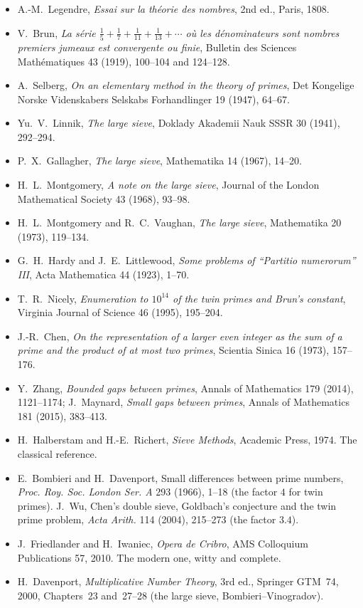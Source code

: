 \begin{itemize}
\item A.-M.~Legendre, \emph{Essai sur la théorie des nombres}, 2nd ed., Paris, 1808.
\item V.~Brun, \emph{La série $\frac15+\frac17+\frac1{11}+\frac1{13}+\cdots$ où les dénominateurs sont nombres premiers jumeaux est convergente ou finie}, Bulletin des Sciences Mathématiques 43 (1919), 100--104 and 124--128.
\item A.~Selberg, \emph{On an elementary method in the theory of primes}, Det Kongelige Norske Videnskabers Selskabs Forhandlinger 19 (1947), 64--67.
\item Yu.~V.~Linnik, \emph{The large sieve}, Doklady Akademii Nauk SSSR 30 (1941), 292--294.
\item P.~X.~Gallagher, \emph{The large sieve}, Mathematika 14 (1967), 14--20.
\item H.~L.~Montgomery, \emph{A note on the large sieve}, Journal of the London Mathematical Society 43 (1968), 93--98.
\item H.~L.~Montgomery and R.~C.~Vaughan, \emph{The large sieve}, Mathematika 20 (1973), 119--134.
\item G.~H.~Hardy and J.~E.~Littlewood, \emph{Some problems of ``Partitio numerorum'' III}, Acta Mathematica 44 (1923), 1--70.
\item T.~R.~Nicely, \emph{Enumeration to $10^{14}$ of the twin primes and Brun's constant}, Virginia Journal of Science 46 (1995), 195--204.
\item J.-R.~Chen, \emph{On the representation of a larger even integer as the sum of a prime and the product of at most two primes}, Scientia Sinica 16 (1973), 157--176.
\item Y.~Zhang, \emph{Bounded gaps between primes}, Annals of Mathematics 179 (2014), 1121--1174; J.~Maynard, \emph{Small gaps between primes}, Annals of Mathematics 181 (2015), 383--413.
\item H.~Halberstam and H.-E.~Richert, \emph{Sieve Methods}, Academic Press, 1974. The classical reference.
\item E.~Bombieri and H.~Davenport, Small differences between prime numbers, \emph{Proc. Roy. Soc. London Ser. A} 293 (1966), 1--18 (the factor $4$ for twin primes). J.~Wu, Chen's double sieve, Goldbach's conjecture and the twin prime problem, \emph{Acta Arith.} 114 (2004), 215--273 (the factor $3.4$).
\item J.~Friedlander and H.~Iwaniec, \emph{Opera de Cribro}, AMS Colloquium Publications 57, 2010. The modern one, witty and complete.
\item H.~Davenport, \emph{Multiplicative Number Theory}, 3rd ed., Springer GTM~74, 2000, Chapters~23 and~27--28 (the large sieve, Bombieri--Vinogradov).
\end{itemize}
